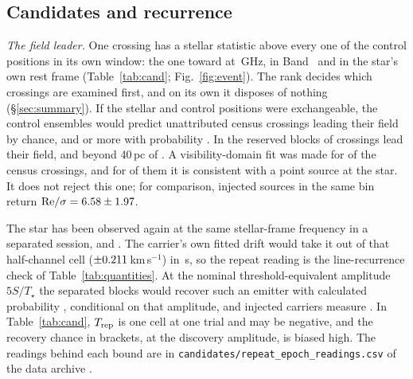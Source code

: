 \subsection{Candidates and recurrence}
\label{sec:etacrv}

\label{sec:vistest}%
\emph{The field leader.} One crossing has a stellar statistic above every
one of the \NCtrl{} control positions in its own window: the one toward
\EvAStar{} at \RqFreqSx\,GHz, in Band~\EvABand{} and in the star's own rest
frame (Table~\ref{tab:cand}; Fig.~\ref{fig:event}). The rank decides which
crossings are examined first, and on its own it disposes of nothing
(\S\ref{sec:summary}). If the stellar and control positions were
exchangeable, the control ensembles would predict \RkCondExp{} unattributed
census crossings leading their field by chance, and \RkCondNObsWord{} or more
with probability \RkCondProb. In the reserved blocks \RkHoLead{} of \RkHoN{}
crossings lead their field, and beyond 40\,pc \RkOosLead{} of \RkOosN. A
visibility-domain fit was made for \CsNVisFit{} of the \CsNCross{} census
crossings, and for \CsNVisLocal{} of them it is consistent with a point source
at the star. It does not reject this one; for comparison, injected sources in
the same bin return ${\rm Re}/\sigma=6.58\pm1.97$.

The star has been observed again at the same stellar-frame frequency in a
separated session, and \RcSxSepClause. The carrier's own fitted drift would
take it out of that half-channel cell ($\pm0.211$\,km\,s$^{-1}$) in
\ZtSxLeaveSec\,s, so the repeat reading is the line-recurrence check of
Table~\ref{tab:quantities}. At the nominal threshold-equivalent amplitude
$5S/T_\star$ the separated blocks would recover such an emitter with
calculated probability \RcSxPowerTrig, conditional on that amplitude, and
injected carriers measure \HjMeasSx. In Table~\ref{tab:cand}, $T_{\rm rep}$ is one cell
at one trial and may be negative, and the recovery chance in brackets, at the
discovery amplitude, is biased high. The readings behind each bound are in
\texttt{candidates/repeat\_epoch\_readings.csv} of the data archive
\citep{SIdeposit}.

